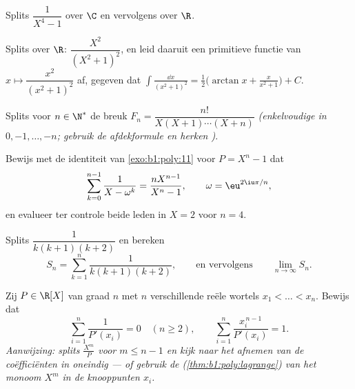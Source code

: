 \begin{exercise}[$\star\star$]\label{exo:b1:fractions:4}
Splits $\dfrac{1}{X^4 - 1}$ over $\C$ en vervolgens over $\R$.
\end{exercise}

\begin{exercise}[$\star\star$]\label{exo:b1:fractions:5}
Splits over $\R$: $\dfrac{X^2}{(X^2 + 1)^2}$, en leid daaruit een
primitieve functie van $x \mapsto \dfrac{x^2}{(x^2+1)^2}$ af, gegeven dat
$\int \frac{\dd x}{(x^2+1)^2} = \frac12\bigl(\arctan x +
\frac{x}{x^2+1}\bigr) + C$.
\end{exercise}

\begin{exercise}[$\star\star$]\label{exo:b1:fractions:6}
Splits voor $n \in \N^*$ de breuk $F_n = \dfrac{n!}{X(X+1)\cdots(X+n)}$
\emph{(enkelvoudige  in $0, -1, \dots, -n$; gebruik de afdekformule
en herken )}.
\end{exercise}

\begin{exercise}[$\star\star$]\label{exo:b1:fractions:7}
Bewijs met de identiteit van \cref{exo:b1:poly:11} voor $P = X^n - 1$ dat
\[
\sum_{k=0}^{n-1} \frac{1}{X - \omega^k} = \frac{n X^{n-1}}{X^n - 1},
\qquad \omega = \eu^{2\iu\pi/n},
\]
en evalueer ter controle beide leden in $X = 2$ voor $n = 4$.
\end{exercise}

\begin{exercise}[$\star\star$]\label{exo:b1:fractions:8}
Splits $\dfrac{1}{k(k+1)(k+2)}$ en bereken
\[
S_n = \sum_{k=1}^{n} \frac{1}{k(k+1)(k+2)},
\qquad\text{en vervolgens}\qquad
\lim_{n \to \infty} S_n .
\]
\end{exercise}

\begin{exercise}[$\star\star\star$]\label{exo:b1:fractions:9}
Zij $P \in \R[X]$  van graad $n$ met $n$ verschillende reële
wortels $x_1 < \dots < x_n$. Bewijs dat
\[
\sum_{i=1}^{n} \frac{1}{P'(x_i)} = 0 \quad (n \geq 2),
\qquad
\sum_{i=1}^{n} \frac{x_i^{\,n-1}}{P'(x_i)} = 1 .
\]
\emph{Aanwijzing: splits $\frac{X^m}{P}$ voor $m \leq n - 1$ en kijk naar
het afnemen van de coëfficiënten in oneindig --- of gebruik de
 (\cref{thm:b1:poly:lagrange}) van het monoom $X^m$
in de knooppunten $x_i$.}
\end{exercise}

